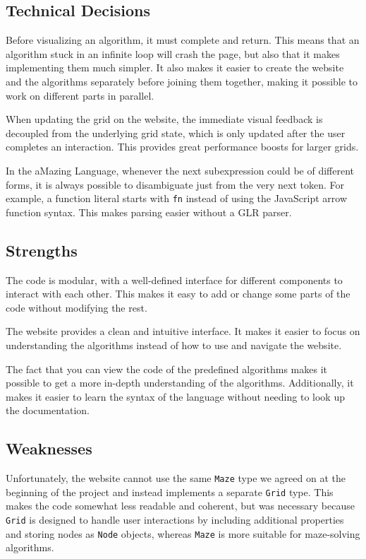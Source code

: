 \subsection{Technical Decisions}

Before visualizing an algorithm, it must complete and return. This means that an algorithm stuck in an infinite loop will crash the page, but also that it makes implementing them much simpler. It also makes it easier to create the website and the algorithms separately before joining them together, making it possible to work on different parts in parallel.

When updating the grid on the website, the immediate visual feedback is decoupled from the underlying grid state, which is only updated after the user completes an interaction. This provides great performance boosts for larger grids.

In the aMazing Language, whenever the next subexpression could be of different forms, it is always possible to disambiguate just from the very next token. For example, a function literal starts with \verb|fn| instead of using the JavaScript arrow function syntax. This makes parsing easier without a GLR parser.

\subsection{Strengths}

The code is modular, with a well-defined interface for different components to interact with each other. This makes it easy to add or change some parts of the code without modifying the rest.

The website provides a clean and intuitive interface. It makes it easier to focus on understanding the algorithms instead of how to use and navigate the website.

The fact that you can view the code of the predefined algorithms makes it possible to get a more in-depth understanding of the algorithms. Additionally, it makes it easier to learn the syntax of the language without needing to look up the documentation.

\subsection{Weaknesses}

Unfortunately, the website cannot use the same \texttt{Maze} type we agreed on at the beginning of the project and instead implements a separate \texttt{Grid} type. This makes the code somewhat less readable and coherent, but was necessary because \texttt{Grid} is designed to handle user interactions by including additional properties and storing nodes as \texttt{Node} objects, whereas \texttt{Maze} is more suitable for maze-solving algorithms.

